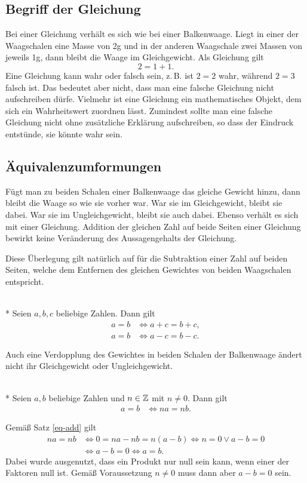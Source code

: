\subsection{Begriff der Gleichung}

Bei einer Gleichung verhält es sich wie bei einer Balkenwaage. Liegt
in einer der Waagschalen eine Masse von 2g und in der anderen
Waagschale zwei Massen von jeweils 1g, dann bleibt die Waage im
Gleichgewicht. Als Gleichung gilt
\[2=1+1.\]
Eine Gleichung kann wahr oder falsch sein, z.\,B. ist $2=2$
wahr, während $2=3$ falsch ist. Das bedeutet aber nicht, dass man
eine falsche Gleichung nicht aufschreiben dürfe. Vielmehr ist eine
Gleichung ein mathematisches Objekt, dem sich ein Wahrheitswert
zuordnen lässt. Zumindest sollte man eine falsche Gleichung nicht
ohne zusätzliche Erklärung aufschreiben, so dass der Eindruck
entstünde, sie könnte wahr sein.

\subsection{Äquivalenzumformungen}%

Fügt man zu beiden Schalen einer Balkenwaage das gleiche Gewicht
hinzu, dann bleibt die Waage so wie sie vorher war. War sie im
Gleichgewicht, bleibt sie dabei. War sie im Ungleichgewicht,
bleibt sie auch dabei. Ebenso verhält es sich mit einer Gleichung.
Addition der gleichen Zahl auf beide Seiten einer Gleichung bewirkt
keine Veränderung des Aussagengehalts der Gleichung.

Diese Überlegung gilt natürlich auf für die Subtraktion einer Zahl
auf beiden Seiten, welche dem Entfernen des gleichen Gewichtes von
beiden Waagschalen entspricht.

\begin{Satz}[Äquivalenzumformungen]\label{eq-add}\mbox{}\\*
Seien $a,b,c$ beliebige Zahlen. Dann gilt
\begin{align*}
a=b&\iff a+c=b+c,\\
a=b&\iff a-c=b-c.
\end{align*}
\end{Satz}

\noindent
Auch eine Verdopplung des Gewichtes in beiden Schalen der Balkenwaage
ändert nicht ihr Gleichgewicht oder Ungleichgewicht.

\begin{Satz}[Äquivalenzumformungen]\label{eq-mul-int}\mbox{}\\*
Seien $a,b$ beliebige Zahlen und $n\in\mathbb Z$ mit $n\ne 0$. Dann gilt
\begin{align*}
a=b&\iff na=nb.
\end{align*}
\end{Satz}
 Gemäß Satz \ref{eq-add} gilt
\begin{align*}
na = nb &\iff 0 = na-nb = n(a-b)\iff n=0\lor a-b=0\\
&\iff a-b=0\iff a=b.
\end{align*}
Dabei wurde ausgenutzt, dass ein Produkt nur null sein kann,
wenn einer der Faktoren null ist. Gemäß Voraussetzung $n\ne 0$ muss
dann aber $a-b=0$ sein.\;\qedsymbol

